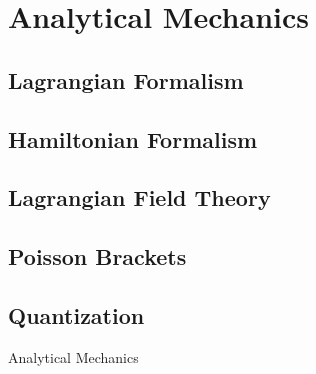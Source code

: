 \section{Analytical Mechanics}
\subsection{Lagrangian Formalism}
\subsection{Hamiltonian Formalism}
\subsection{Lagrangian Field Theory}
\subsection{Poisson Brackets}
\subsection{Quantization}

Analytical Mechanics